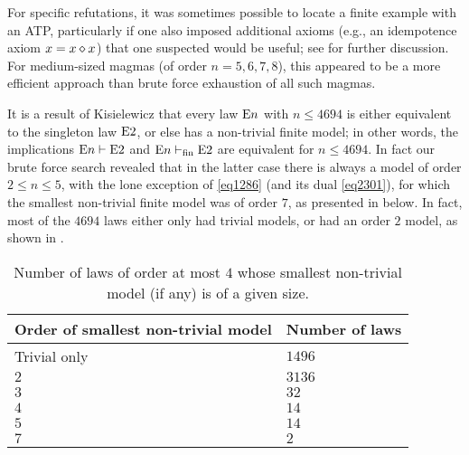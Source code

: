For specific refutations, it was sometimes possible to locate a finite example with an ATP, particularly if one also imposed additional axioms (e.g., an idempotence axiom $x = x \diamond x$) that one suspected would be useful; see  for further discussion.  For medium-sized magmas (of order $n=5,6,7,8$), this appeared to be a more efficient approach than brute force exhaustion of all such magmas.

It is a result of Kisielewicz \cite{Kisielewicz} that every law $\mathrm{E}n$ with $n \leq 4694$ is either equivalent to the singleton law $\mathrm{E}2$, or else has a non-trivial finite model; in other words, the implications $\mathrm{E}n \vdash \mathrm{E}2$ and $\mathrm{E}n \vdash_{\mathrm{fin}} \mathrm{E}2$ are equivalent for $n \leq 4694$.  In fact our brute force search revealed that in the latter case there is always a model of order $2 \leq n \leq 5$, with the lone exception of \eqref{eq1286} (and its dual \eqref{eq2301}), for which the smallest non-trivial finite model was of order $7$, as presented in  below.  In fact, most of the $\num{4694}$ laws either only had trivial models, or had an order $2$ model, as shown in .
\begin{table}
\centering
\begin{tabular}{ll}
  \hline
Order of smallest non-trivial model & Number of laws \\
\hline
Trivial only & $1496$ \\
$2$ & $3136$ \\
$3$ & $32$ \\
$4$ & $14$ \\
$5$ & $14$ \\
$7$ & $2$\\
\hline
\end{tabular}
\caption{Number of laws of order at most $4$ whose smallest non-trivial model (if any) is of a given size.}\label{size-table}
\end{table}

